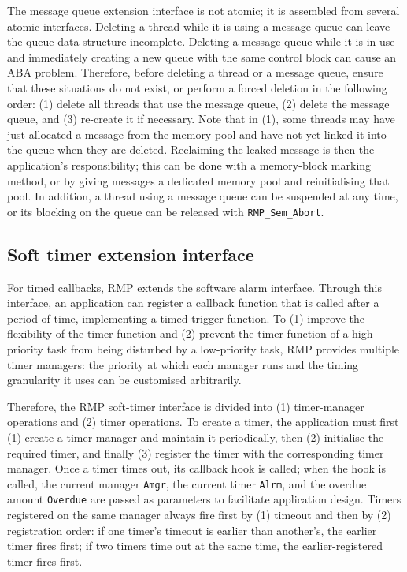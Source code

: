 The message queue extension interface is not atomic; it is assembled from several atomic interfaces.
Deleting a thread while it is using a message queue can leave the queue data structure incomplete.
Deleting a message queue while it is in use and immediately creating a new queue with the same control block can cause an ABA problem.
Therefore, before deleting a thread or a message queue, ensure that these situations do not exist, or perform a forced deletion in the following order: (1) delete all threads that use the message queue, (2) delete the message queue, and (3) re-create it if necessary.
Note that in (1), some threads may have just allocated a message from the memory pool and have not yet linked it into the queue when they are deleted.
Reclaiming the leaked message is then the application's responsibility; this can be done with a memory-block marking method, or by giving messages a dedicated memory pool and reinitialising that pool.
In addition, a thread using a message queue can be suspended at any time, or its blocking on the queue can be released with \texttt{RMP\_Sem\_Abort}.

\subsection{Soft timer extension interface}

For timed callbacks, RMP extends the software alarm interface.
Through this interface, an application can register a callback function that is called after a period of time, implementing a timed-trigger function.
To (1) improve the flexibility of the timer function and (2) prevent the timer function of a high-priority task from being disturbed by a low-priority task, RMP provides multiple timer managers: the priority at which each manager runs and the timing granularity it uses can be customised arbitrarily.

Therefore, the RMP soft-timer interface is divided into (1) timer-manager operations and (2) timer operations.
To create a timer, the application must first (1) create a timer manager and maintain it periodically, then (2) initialise the required timer, and finally (3) register the timer with the corresponding timer manager.
Once a timer times out, its callback hook is called; when the hook is called, the current manager \texttt{Amgr}, the current timer \texttt{Alrm}, and the overdue amount \texttt{Overdue} are passed as parameters to facilitate application design.
Timers registered on the same manager always fire first by (1) timeout and then by (2) registration order: if one timer's timeout is earlier than another's, the earlier timer fires first; if two timers time out at the same time, the earlier-registered timer fires first.

